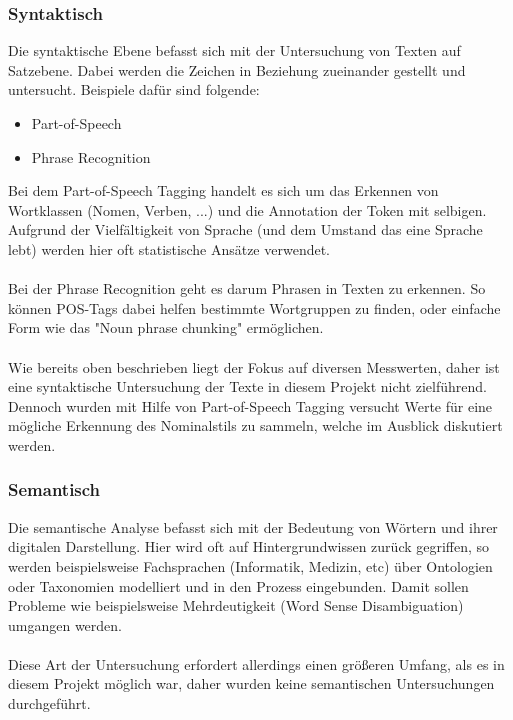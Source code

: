 \subsubsection{Syntaktisch}
Die syntaktische Ebene befasst sich mit der Untersuchung von Texten auf Satzebene. Dabei werden die Zeichen in Beziehung zueinander gestellt und untersucht. Beispiele dafür sind folgende:\\
\begin{itemize}
\item Part-of-Speech
\item Phrase Recognition
\end{itemize}
Bei dem Part-of-Speech Tagging handelt es sich um das Erkennen von Wortklassen (Nomen, Verben, ...) und die Annotation der Token mit selbigen. Aufgrund der Vielfältigkeit von Sprache (und dem Umstand das eine Sprache lebt) werden hier oft statistische Ansätze verwendet.\\ 
\\
Bei der Phrase Recognition geht es darum Phrasen in Texten zu erkennen. So können POS-Tags dabei helfen bestimmte Wortgruppen zu finden, oder einfache Form wie das "Noun phrase chunking" ermöglichen.\\
\\
Wie bereits oben beschrieben liegt der Fokus auf diversen Messwerten, daher ist eine syntaktische Untersuchung der Texte in diesem Projekt nicht zielführend. Dennoch wurden mit Hilfe von Part-of-Speech Tagging versucht Werte für eine mögliche Erkennung des Nominalstils zu sammeln, welche im Ausblick diskutiert werden.

\subsubsection{Semantisch}
Die semantische Analyse befasst sich mit der Bedeutung von Wörtern und ihrer digitalen Darstellung. Hier wird oft auf Hintergrundwissen zurück gegriffen, so werden beispielsweise Fachsprachen (Informatik, Medizin, etc) über Ontologien oder Taxonomien modelliert und in den Prozess eingebunden. Damit sollen Probleme wie beispielsweise Mehrdeutigkeit (Word Sense Disambiguation) umgangen werden. \\
\\
Diese Art der Untersuchung erfordert allerdings einen größeren Umfang, als es in diesem Projekt möglich war, daher wurden keine semantischen Untersuchungen durchgeführt.

